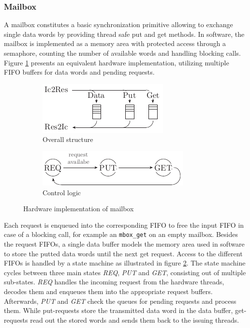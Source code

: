 \subsubsection{Mailbox}
A mailbox constitutes a basic synchronization primitive allowing to exchange
single data words by providing thread safe put and get methods. In software,
the mailbox is implemented as a memory area with protected access through a
semaphore, counting the number of available words and handling blocking calls.
Figure \ref{fig:mbox_hw_struct} presents an equivalent hardware
implementation, utilizing multiple \ac{FIFO} buffers for data words and
pending requests.
\begin{figure}
	\centering
	\begin{subfigure}{0.49\textwidth}
		\centering
		\includegraphics{../figures/mbox_hw_struct}
		\caption{Overall structure}
		\label{fig:mbox_hw_struct}
	\end{subfigure}
	\begin{subfigure}{0.49\textwidth}
		\centering
		\includegraphics{../figures/mbox_hw_fsm}
		\caption{Control logic}
		\label{fig:mbox_hw_fsm}
	\end{subfigure}
	\caption{Hardware implementation of mailbox}
	\label{fig:mbox_hw}
\end{figure}
Each request is enqueued into the corresponding \ac{FIFO} to free the input
\ac{FIFO} in case of a blocking call, for example an \lstinline{mbox_get} on
an empty mailbox. Besides the request \acp{FIFO}, a single data buffer models
the memory area used in software to store the putted data words until the
next get request. Access to the different \acp{FIFO} is handled by a state
machine as illustrated in figure \ref{fig:mbox_hw_fsm}. The state machine
cycles between three main states \emph{REQ}, \emph{PUT} and \emph{GET},
consisting out of multiple sub-states. \emph{REQ} handles the incoming request
from the hardware threads, decodes them and enqueues them into the appropriate
request buffers. Afterwards, \emph{PUT} and \emph{GET} check the queues for
pending requests and process them. While put-requests store the transmitted
data word in the data buffer, get-requests read out the stored words and
sends them back to the issuing threads. 

